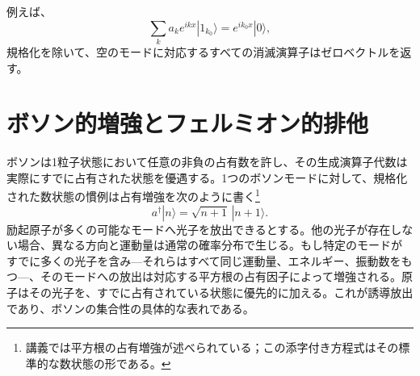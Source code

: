 \begin{classroomqa}
\end{classroomqa}

\begin{classroomqa}
\end{classroomqa}

\begin{classroomqa}
\end{classroomqa}

例えば、
\begin{equation}
\sum_k a_k e^{ikx}|1_{k_0}\rangle
=e^{ik_0x}|0\rangle,
\end{equation}
規格化を除いて、空のモードに対応するすべての消滅演算子はゼロベクトルを返す。

\section{ボソン的増強とフェルミオン的排他}

ボソンは1粒子状態において任意の非負の占有数を許し、その生成演算子代数は実際にすでに占有された状態を優遇する。1つのボソンモードに対して、規格化された数状態の慣例は占有増強を次のように書く\footnote{講義では平方根の占有増強が述べられている；この添字付き方程式はその標準的な数状態の形である。}
\begin{equation}
a^\dagger|n\rangle=\sqrt{n+1}\,|n+1\rangle.
\end{equation}
励起原子が多くの可能なモードへ光子を放出できるとする。他の光子が存在しない場合、異なる方向と運動量は通常の確率分布で生じる。もし特定のモードがすでに多くの光子を含み---それらはすべて同じ運動量、エネルギー、振動数をもつ---、そのモードへの放出は対応する平方根の占有因子によって増強される。原子はその光子を、すでに占有されている状態に優先的に加える。これが誘導放出であり、ボソンの集合性の具体的な表れである。

